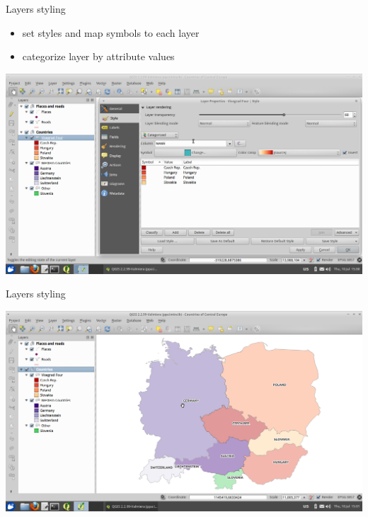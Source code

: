 \documentclass[12pt]{beamer}
\begin{document}
\begin{frame}{Layers styling}
	\begin{itemize}
		\item set styles and map symbols to each layer
		\item categorize layer by attribute values
	\end{itemize}
	\begin{center}
		\includegraphics[keepaspectratio=true,height=0.6\textheight]{images/rapid-gis-deployment/project-layer-style.png}
	\end{center}
\end{frame}


\begin{frame}{Layers styling}
	\begin{center}
		\includegraphics[keepaspectratio=true,height=0.6\textheight]{images/rapid-gis-deployment/project-layer-style-ready.png}
	\end{center}
\end{frame}
\end{document}
